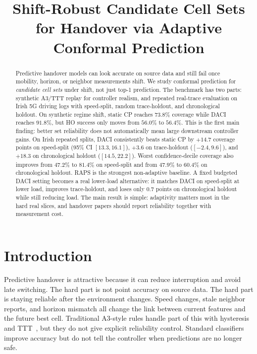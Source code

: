 \documentclass[conference]{IEEEtran}
\title{Shift-Robust Candidate Cell Sets for Handover via Adaptive Conformal Prediction}
\author{
\IEEEauthorblockN{Johan Eliasson Eklund}
\IEEEauthorblockA{\url{https://github.com/elitan}}
}
\begin{document}
\maketitle

\begin{abstract}
Predictive handover models can look accurate on source data and still fail once mobility, horizon, or neighbor measurements shift. We study conformal prediction for \emph{candidate cell sets} under shift, not just top-1 prediction. The benchmark has two parts: synthetic A3/TTT replay for controller realism, and repeated real-trace evaluation on Irish 5G driving logs with speed-split, random trace-holdout, and chronological holdout. On synthetic regime shift, static CP reaches $73.8\%$ coverage while DACI reaches $91.8\%$, but HO success only moves from $56.0\%$ to $56.4\%$. This is the first main finding: better set reliability does not automatically mean large downstream controller gains. On Irish repeated splits, DACI consistently beats static CP by $+14.7$ coverage points on speed-split (95\% CI $[13.3,16.1]$), $+3.6$ on trace-holdout ($[-2.4,9.6]$), and $+18.3$ on chronological holdout ($[14.5,22.2]$). Worst confidence-decile coverage also improves from $47.2\%$ to $81.4\%$ on speed-split and from $47.9\%$ to $60.4\%$ on chronological holdout. RAPS is the strongest non-adaptive baseline. A fixed budgeted DACI setting becomes a real lower-load alternative: it matches DACI on speed-split at lower load, improves trace-holdout, and loses only $0.7$ points on chronological holdout while still reducing load. The main result is simple: adaptivity matters most in the hard real slices, and handover papers should report reliability together with measurement cost.
\end{abstract}

\section{Introduction}

Predictive handover is attractive because it can reduce interruption and avoid late switching. The hard part is not point accuracy on source data. The hard part is staying reliable after the environment changes. Speed changes, stale neighbor reports, and horizon mismatch all change the link between current features and the future best cell. Traditional A3-style rules handle part of this with hysteresis and TTT~\cite{3gpp38331,3gpp38214}, but they do not give explicit reliability control. Standard classifiers improve accuracy but do not tell the controller when predictions are no longer safe.
\end{document}
